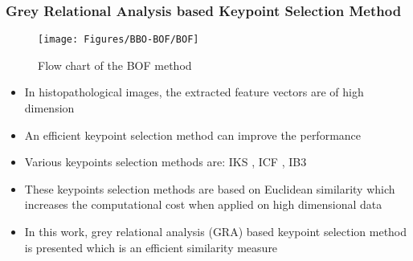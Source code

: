 \documentclass [9pt,times] {beamer}
\begin{document}
\begin{frame}\frametitle{Grey Relational Analysis based Keypoint Selection Method}
\begin{figure}[t]
			\centering
			\texttt{[image: Figures/BBO-BOF/BOF]}
			\caption{{\scriptsize Flow chart of the BOF method}}\label{fig:emp}
\end{figure}
		
\begin{itemize}
\justifying
\item  In histopathological images, the extracted feature vectors are of high dimension\\[2ex]

\item An efficient keypoint selection method can improve the performance\\[2ex]

\item Various keypoints selection methods are: IKS \cite{lin2016}, ICF \cite{brighton2002}, IB3 \cite{aha1991} \\[2ex]

\item These keypoints selection methods are based on Euclidean similarity which increases the computational cost when applied on high dimensional data \cite{chang2005}\\[2ex]

\item In this work, grey relational analysis (GRA)  based keypoint selection method is presented which is an efficient similarity measure \\[0.2cm] 


\end{itemize}
\end{frame}
\end{document}
